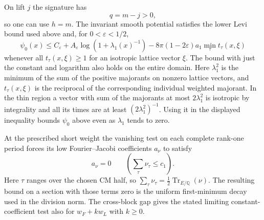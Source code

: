 On lift \(j\) the
signature has 
\[
  q=m-j>0,
\]
 so one can use \(h=m\).
The invariant smooth potential satisfies the lower Levi
bound used above and, for \(0<\varepsilon<1/2\),
\[
 \psi_0(x)\le C_\varepsilon
    +A_\varepsilon\log(1+\lambda_1(x)^{-1})
    -8\pi(1-2\varepsilon)a_1\min_\tau t_\tau(x,\xi)
\]
whenever all \(t_\tau(x,\xi)\ge1\) for an isotropic
lattice vector \(\xi\). The bound with just the constant
and logarithm also holds on the entire domain.
Here \(\lambda_1^2\) is the minimum of the sum of the
positive majorants on nonzero lattice vectors, and
\(t_\tau(x,\xi)\) is the reciprocal of the corresponding
individual weighted majorant. In the thin region a
vector with sum of the majorants at most
\(2\lambda_1^2\) is isotropic by integrality and all its
times are at least \((2\lambda_1^2)^{-1}\). Using it in
the displayed inequality bounds \(\psi_0\) above even
as \(\lambda_1\) tends to zero.
\label{cor:slice-short-analytic-4}

\begin{proposition}
\label{prop:slice-cusp-gap-decay}
At the prescribed short weight the vanishing test on each complete rank-one period forces its low Fourier--Jacobi coefficients \(a_\nu\) to satisfy
\[
 a_\nu=0\qquad\left(\sum_\tau\nu_\tau\le c_1\right).
\]
 Here \(\tau\) ranges over the chosen CM half, so
\(\sum_\tau\nu_\tau=\tfrac12\operatorname{Tr}_{E/\mathbb Q}(\nu)\).
The resulting bound on a section with those terms zero
is the uniform first-minimum decay used in the division norm.
The cross-block gap gives the stated limiting constant-coefficient
test also for \(w_F+k w_L\) with \(k\ge0\).
\end{proposition}

